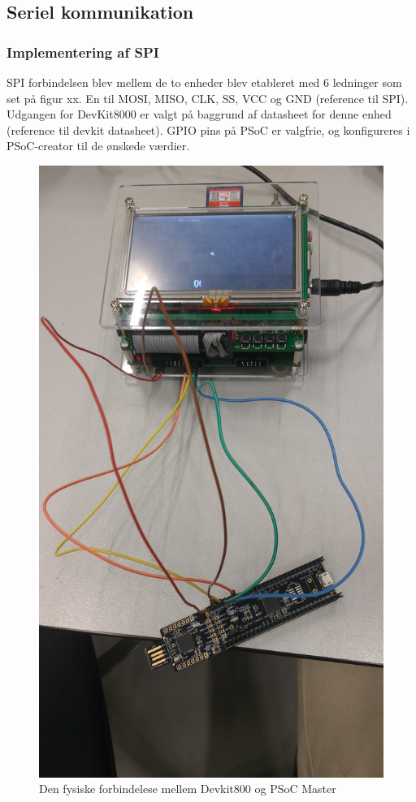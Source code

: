 \subsection{Seriel kommunikation}

\subsubsection{Implementering af SPI}
SPI forbindelsen blev mellem de to enheder blev etableret med 6 ledninger som set på figur xx. En til MOSI, MISO, CLK, SS, VCC og GND (reference til SPI).
Udgangen for DevKit8000 er valgt på baggrund af datasheet for denne enhed (reference til devkit datasheet). GPIO pins på PSoC er valgfrie, og konfigureres 
i PSoC-creator til de ønskede værdier.

\begin{figure}[H]
\includegraphics[scale=0.6]{tex/TeImRe/SPI/Realisering_devkit_psoc}
\caption{Den fysiske forbindelese mellem Devkit800 og PSoC Master}
\end{figure}

